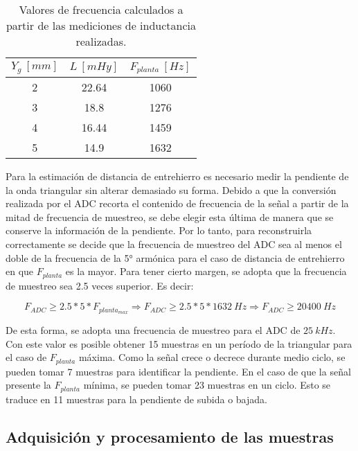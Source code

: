 \begin{table}[H]
	\begin{center}
		\begin{tabular}{| c | c | c |}
			\hline
			$Y_g\:[mm]$ & $L\:[mHy]$ & $F_{planta}\:[Hz]$\\ \hline
			2 & 22.64 & 1060\\ \hline
			3 & 18.8 & 1276\\ \hline
			4 & 16.44 & 1459\\ \hline
			5 & 14.9 & 1632\\ \hline
		\end{tabular}
		\caption{Valores de frecuencia calculados a partir de las mediciones de inductancia realizadas.}
		\label{frecuencias-calculadas}
	\end{center}
\end{table}


 Para la estimación de distancia de entrehierro es necesario medir la pendiente de la onda triangular sin alterar demasiado su forma. Debido a que la conversión realizada por el ADC recorta el contenido de frecuencia de la señal a partir de la mitad de frecuencia de muestreo, se debe elegir esta última de manera que se conserve la información de la pendiente.  Por lo tanto, para reconstruirla correctamente se decide que la frecuencia de muestreo del ADC sea al menos el doble de la frecuencia de la 5° armónica para el caso de distancia de entrehierro en que $F_{planta}$ es la mayor. Para tener cierto margen, se adopta que la frecuencia de muestreo sea 2.5 veces superior. Es decir:

\begin{equation} 
	F_{ADC} \geq 2.5 * 5 * F_{planta_{max}} \Rightarrow  F_{ADC} \geq 2.5 * 5 * 1632\:Hz \Rightarrow F_{ADC} \geq 20400\:Hz
\end{equation}


 De esta forma, se adopta una frecuencia de muestreo para el ADC de  $25\:kHz$. Con este valor es posible obtener 15 muestras en un período de la triangular para el caso de $F_{planta}$ máxima. Como la señal crece o decrece durante medio ciclo, se pueden tomar 7 muestras para identificar la pendiente. En el caso de que la señal presente la $F_{planta}$ mínima, se pueden tomar 23 muestras en un ciclo. Esto se traduce en 11 muestras para la pendiente de subida o bajada. 


\subsection{Adquisición y procesamiento de las muestras} \label{sec_adquisicion_y_procesamiento}


